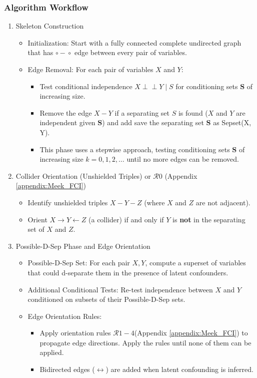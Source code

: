 \documentclass[main.tex]{subfiles}
\begin{document}
\subsubsection{Algorithm Workflow} \label{sec3:fci_algo_flo}
\begin{enumerate}
    \item Skeleton Construction
        \begin{itemize}
          \item Initialization: Start with a fully connected complete undirected graph that has $\circ\!\!-\!\!\circ$ edge between every pair of variables.
          \item Edge Removal: For each pair of variables $X$ and $Y$:
            \begin{itemize}
              \item Test conditional independence $X \perp\!\!\!\perp Y \mid S$ for conditioning sets $\textbf{S}$ of increasing size.
              \item Remove the edge $X - Y$ if a separating set $S$ is found ($X$ and $Y$ are independent given $\textbf{S}$) and add save the separating set $\textbf{S}$ as Sepset(X, Y). 
              \item This phase uses a stepwise approach, testing conditioning sets $\mathbf{S}$ of increasing size $k = 0, 1, 2, \dots$ until no more edges can be removed. 
            \end{itemize}
        \end{itemize}
    \item Collider Orientation (Unshielded Triples) or $\mathcal{R}0$ (Appendix \ref{appendix:Meek_FCI})

        \begin{itemize}
            \item Identify unshielded triples $X - Y - Z$ (where $X$ and $Z$ are not adjacent).
            \item Orient $X \rightarrow Y \leftarrow Z$ (a collider) if and only if $Y$ is \textbf{not} in the separating set of $X$ and $Z$.
        \end{itemize}
    \item Possible-D-Sep Phase and Edge Orientation
    \begin{itemize}
          \item Possible-D-Sep Set: For each pair $X, Y$, compute a superset of variables that could d-separate them in the presence of latent confounders.
          \item Additional Conditional Tests: Re-test independence between $X$ and $Y$ conditioned on subsets of their Possible-D-Sep sets.
          \item Edge Orientation Rules:
            \begin{itemize}
              \item Apply orientation rules $\mathcal{R}1-4$(Appendix \ref{appendix:Meek_FCI}) to propagate edge directions. Apply the rules until none of them can be applied.
              \item Bidirected edges ($\leftrightarrow$) are added when latent confounding is inferred.
            \end{itemize}
        \end{itemize}
\end{enumerate}
\end{document}
